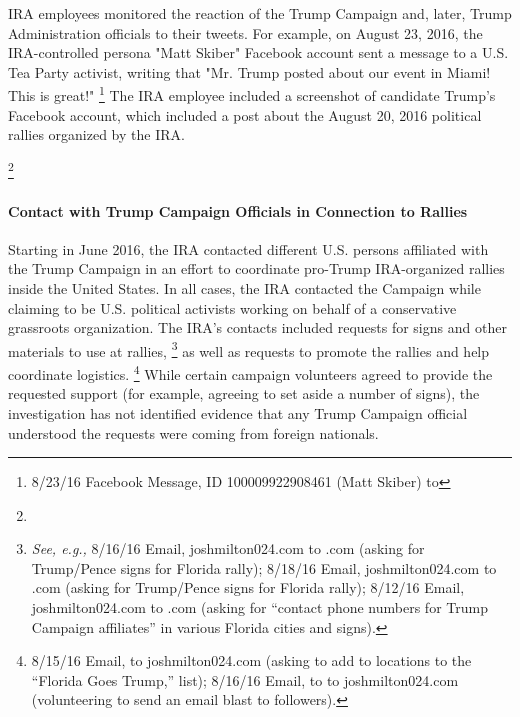 IRA employees monitored the reaction of the Trump Campaign and, later, Trump Administration officials to their tweets.
For example, on August 23, 2016, the IRA-controlled persona "Matt Skiber" Facebook account sent a message to a U.S. Tea Party activist, writing that "Mr. Trump posted about our event in Miami! This is great!"%
\footnote{8/23/16 Facebook Message, ID 100009922908461 (Matt Skiber) to }
The IRA employee included a screenshot of candidate Trump's Facebook account, which included a post about the August 20, 2016 political rallies organized by the IRA.

\footnote{}

\paragraph{Contact with Trump Campaign Officials in Connection to Rallies}

Starting in June 2016, the IRA contacted different U.S. persons affiliated with the Trump Campaign in an effort to coordinate pro-Trump IRA-organized rallies inside the United States.
In all cases, the IRA contacted the Campaign while claiming to be U.S. political activists working on behalf of a conservative grassroots organization.
The IRA's contacts included requests for signs and other materials to use at rallies,%
\footnote{\textit{See, e.g.,} 8/16/16 Email, joshmilton024\@gmail.com to \@donaldtrump.com (asking for Trump/Pence signs for Florida rally);
8/18/16 Email, joshmilton024\@gmail.com to \@donaldtrump.com (asking for Trump/Pence signs for Florida rally);
8/12/16 Email, joshmilton024\@gmail.com to \@donaldtrump.com (asking for “contact phone numbers for Trump Campaign affiliates” in various Florida cities and signs).
}
as well as requests to promote the rallies and help coordinate logistics.%
\footnote{8/15/16 Email,  to joshmilton024\@gmail.com (asking to add to locations to the “Florida Goes Trump,” list);
8/16/16 Email, to  to joshmilton024\@gmail.com (volunteering to send an email blast to followers).}
While certain campaign volunteers agreed to provide the requested support (for example, agreeing to set aside a number of signs), the investigation has not identified evidence that any Trump Campaign official understood the requests were coming from foreign nationals.

